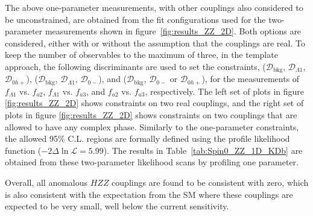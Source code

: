 The above one-parameter measurements, with other couplings also considered to be unconstrained, are obtained
from the fit configurations used for the two-parameter measurements shown in figure~\ref{fig:results_ZZ_2D}.
Both options are considered, either with or without the assumption that the couplings are real. To keep
the number of observables to the maximum of three, in the template approach, the following discriminants are
used to set the constraints,
($\mathcal{D}_\text{bkg}$, $\mathcal{D}_{\Lambda1}$, $\mathcal{D}_{0h+}$),
($\mathcal{D}_\text{bkg}$, $\mathcal{D}_{\Lambda1}$, $\mathcal{D}_{0-}$),
and ($\mathcal{D}_\text{bkg}$, $\mathcal{D}_{0-}$ or $\mathcal{D}_{0h+}$),
for the measurements of
$f_{\Lambda1}$ vs. $f_{a2}$, $f_{\Lambda1}$ vs. $f_{a3}$, and $f_{a2}$ vs. $f_{a3}$, respectively.
The left set of plots in figure \ref{fig:results_ZZ_2D} shows constraints on two real couplings, and
the right set of plots in figure \ref{fig:results_ZZ_2D} shows constraints on two couplings that are
allowed to have any complex phase. Similarly to the one-parameter constraints,
the allowed 95\% C.L. regions are formally defined using the profile likelihood function ($-2\Delta \ln\mathcal{L} = 5.99$).
The results in Table~\ref{tab:Spin0_ZZ_1D_KDb} are obtained from these two-parameter likelihood scans by profiling one parameter.

Overall, all anomalous $HZZ$ couplings are found to be consistent with zero, which is also consistent with the expectation
from the SM where these couplings are expected to be very small, well below the current sensitivity.

